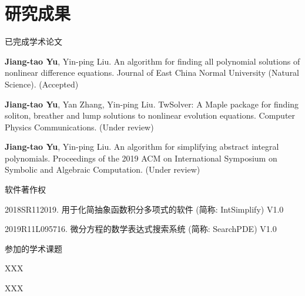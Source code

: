 \chapter*{研究成果}

\noindent 已完成学术论文
\begin{enumerate}[label={[\arabic*]},leftmargin=*]
\item {\bf Jiang-tao Yu}, Yin-ping Liu. An algorithm for finding all polynomial
solutions of nonlinear difference equations. Journal of East China Normal University (Natural Science). (Accepted)
\item {\bf Jiang-tao Yu}, Yan Zhang, Yin-ping Liu. TwSolver: A Maple package for finding soliton, breather and lump solutions to nonlinear evolution equations. Computer Physics Communications. (Under review)
\item {\bf Jiang-tao Yu}, Yin-ping Liu. An algorithm for simplifying abstract integral polynomials. Proceedings of the 2019 ACM on International Symposium on Symbolic and Algebraic Computation. (Under review)
\end{enumerate}

\noindent 软件著作权
\begin{enumerate}[label={[\arabic*]},leftmargin=*]
\item 2018SR112019. 用于化简抽象函数积分多项式的软件 (简称: IntSimplify) V1.0
\item 2019R11L095716. 微分方程的数学表达式搜索系统 (简称: SearchPDE) V1.0
\end{enumerate}

\noindent 参加的学术课题
\begin{enumerate}[label={[\arabic*]},leftmargin=*]
\item XXX
\item XXX
\end{enumerate}

